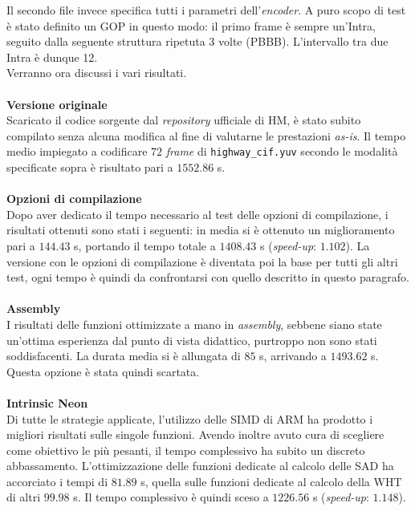 Il secondo file invece specifica tutti i parametri dell'\emph{encoder}. A puro 
scopo di test è stato definito un GOP in questo modo: il primo frame è sempre 
un'Intra, seguito dalla seguente struttura ripetuta 3 volte (PBBB). 
L'intervallo tra due Intra è dunque 12. \\
Verranno ora discussi i vari risultati.
\\ \\
\textbf{Versione originale}\\
  Scaricato il codice sorgente dal \emph{repository} ufficiale di HM, è stato 
  subito compilato senza alcuna modifica al fine di valutarne le prestazioni 
  \emph{as-is}. Il tempo medio impiegato a codificare $72$ \emph{frame} di 
  \verb|highway_cif.yuv| secondo le modalità specificate sopra è risultato pari 
  a $1552.86$ s.
\\ \\
\textbf{Opzioni di compilazione}\\
  Dopo aver dedicato il tempo necessario al test delle opzioni di compilazione, 
  i risultati ottenuti sono stati i seguenti: in media si è ottenuto un 
  miglioramento pari a $144.43$ s, portando il tempo totale a $1408.43$ s 
  (\textit{speed-up}: $1.102$).
  La versione con le opzioni di compilazione è diventata poi la base per tutti 
  gli altri test, ogni tempo è quindi da confrontarsi con quello descritto in 
  questo paragrafo.
\\ \\
\textbf{Assembly}\\
  I risultati delle funzioni ottimizzate a mano in \emph{assembly}, sebbene 
  siano state un'ottima esperienza dal punto di vista didattico, purtroppo non 
  sono stati soddisfacenti. 
  La durata media si è allungata di $85$ s, arrivando a $1493.62$ s. Questa 
  opzione è stata quindi scartata.
\\ \\
\textbf{Intrinsic Neon}\\
  Di tutte le strategie applicate, l'utilizzo delle SIMD di ARM ha prodotto i 
  migliori risultati sulle singole funzioni. Avendo inoltre avuto cura di 
  scegliere come obiettivo le più pesanti, il tempo complessivo ha subito un 
  discreto abbassamento.
  L'ottimizzazione delle funzioni dedicate al calcolo delle SAD ha accorciato i 
  tempi di $81.89$ s, quella sulle funzioni dedicate al calcolo della WHT di 
  altri $99.98$ s. Il tempo complessivo è quindi sceso a $1226.56$ s   
  (\textit{speed-up}: $1.148$).
  

